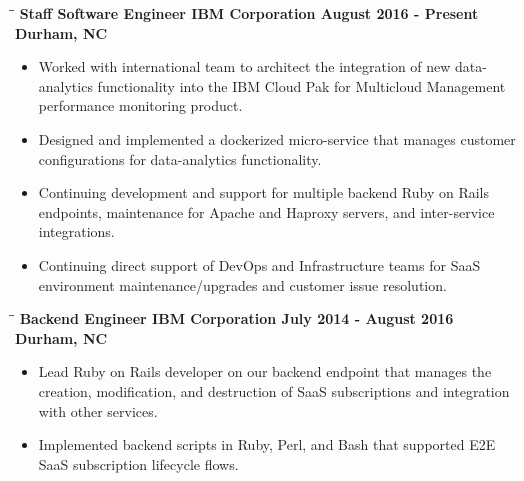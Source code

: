\documentclass[8pt]{res}
\begin{document}
\begin{resume}
    \begin{tabbing}
      \hspace{2.3in}\= \hspace{2.6in}\= \kill %
      \bf Staff Software Engineer \>\bf IBM Corporation \>\bf August 2016 - Present\\ \>\bf Durham, NC
    \end{tabbing}\vspace{-10pt}      %
    \begin{itemize}
      \item Worked with international team to architect the integration of new data-analytics functionality into the IBM Cloud Pak for Multicloud Management performance monitoring product.
      \item Designed and implemented a dockerized micro-service that manages customer configurations for data-analytics functionality.
      \item Continuing development and support for multiple backend Ruby on Rails endpoints, maintenance for Apache and Haproxy servers, and inter-service integrations.
      \item Continuing direct support of DevOps and Infrastructure teams for SaaS environment maintenance/upgrades and customer issue resolution.
    \end{itemize}\vspace{-18pt}      %
    \begin{tabbing}
      \hspace{2.3in}\= \hspace{2.6in}\= \kill %
      \bf Backend Engineer \>\bf IBM Corporation \>\bf July 2014 - August 2016\\ \>\bf Durham, NC
    \end{tabbing}\vspace{-10pt}      %
    \begin{itemize}
      \item Lead Ruby on Rails developer on our backend endpoint that manages the creation, modification, and destruction of SaaS subscriptions and integration with other services.
      \item Implemented backend scripts in Ruby, Perl, and Bash that supported E2E SaaS subscription lifecycle flows.

\end{itemize}
\end{resume}
\end{document}
